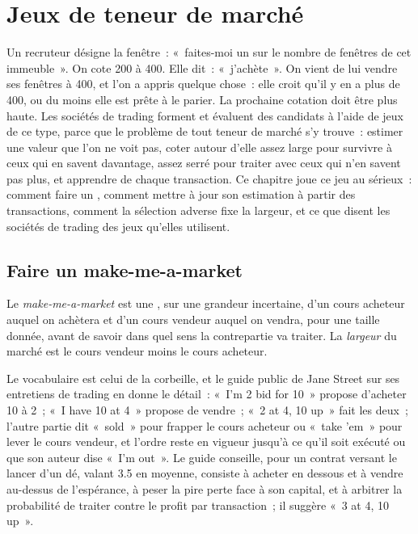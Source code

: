 \chapter{Jeux de teneur de marché}\label{ch:m2:market-making-games}

Un recruteur désigne la fenêtre~: «~faites-moi un  sur le nombre de fenêtres de cet
immeuble~». On cote 200 à 400. Elle dit~: «~j'achète~». On vient de lui vendre ses fenêtres à 400,
et l'on a appris quelque chose~: elle croit qu'il y en a plus de 400, ou du moins elle est
prête à le parier. La prochaine cotation doit être plus haute. Les sociétés de trading forment et évaluent
des candidats à l'aide de jeux de ce type, parce que le problème de tout teneur de marché s'y trouve~: estimer une
valeur que l'on ne voit pas, coter autour d'elle assez large pour survivre à ceux qui en savent davantage,
assez serré pour traiter avec ceux qui n'en savent pas plus, et apprendre de chaque transaction. Ce
chapitre joue ce jeu au sérieux~: comment faire un , comment mettre à jour
son estimation à partir des transactions, comment la sélection adverse fixe la largeur, et ce que disent les sociétés de trading des jeux qu'elles utilisent.

\section{Faire un make-me-a-market}

\begin{definition}\label{def:m2:market-making-games:mmam}
Le \emph{make-me-a-market} est une , sur une grandeur incertaine,
d'un cours acheteur auquel on achètera et d'un cours vendeur auquel on vendra, pour une taille donnée,
avant de savoir dans quel sens la contrepartie va traiter. La \emph{largeur}
du marché est le cours vendeur moins le cours acheteur.
\end{definition}

Le vocabulaire est celui de la corbeille, et le guide public de Jane Street sur ses
entretiens de trading en donne le détail~: «~I'm 2 bid for 10~» propose d'acheter 10 à 2~; «~I have 10 at 4~»
propose de vendre~; «~2 at 4, 10 up~» fait les deux~; l'autre partie dit «~sold~» pour frapper le cours acheteur ou
«~take 'em~» pour lever le cours vendeur, et l'ordre reste en vigueur jusqu'à ce qu'il soit exécuté ou que son auteur dise
«~I'm out~». Le guide conseille, pour un contrat versant le lancer d'un dé, valant 3.5 en
moyenne, consiste à acheter en dessous et à vendre au-dessus de l'espérance, à peser la pire perte
face à son capital, et à arbitrer la probabilité de traiter contre le profit par
transaction~; il suggère «~3 at 4, 10 up~».

